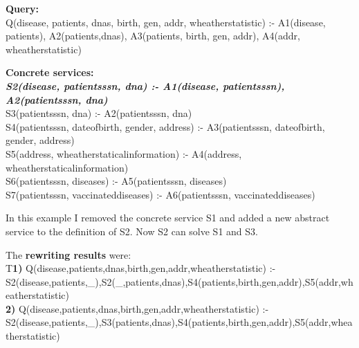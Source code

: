 \documentclass[12pt,a4paper,oneside]{report}
\begin{document}
\begin{flushleft}
\textbf{Query:} \\
Q(disease, patients, dnas, birth, gen, addr, wheatherstatistic) :- A1(disease, patients), A2(patients,dnas), A3(patients, birth, gen, addr), A4(addr, wheatherstatistic) \\
\end{flushleft}

\begin{flushleft}
\textbf{Concrete services:} \\
\textbf{\textit{S2(disease, patientsssn, dna) :- A1(disease, patientsssn), A2(patientsssn, dna)}}\\
S3(patientsssn, dna) :- A2(patientsssn, dna)\\
S4(patientsssn, dateofbirth, gender, address) :- A3(patientsssn, dateofbirth, gender, address)\\
S5(address, wheatherstaticalinformation) :- A4(address, wheatherstaticalinformation)\\
S6(patientsssn, diseases) :- A5(patientsssn, diseases)\\
S7(patientsssn, vaccinateddiseases) :- A6(patientsssn, vaccinateddiseases)\\
\end{flushleft}

In this example I removed the concrete service S1 and added a new abstract service to the definition of S2. Now S2 can solve S1 and S3.

\begin{flushleft}
The \textbf{rewriting results} were: \\
T\textbf{1) }Q(disease,patients,dnas,birth,gen,addr,wheatherstatistic) :- S2(disease,patients,\_),S2(\_,patients,dnas),S4(patients,birth,gen,addr),S5(addr,wheatherstatistic) \\
\textbf{2) }Q(disease,patients,dnas,birth,gen,addr,wheatherstatistic) :- S2(disease,patients,\_),S3(patients,dnas),S4(patients,birth,gen,addr),S5(addr,wheatherstatistic)
\end{flushleft}
\end{document}
